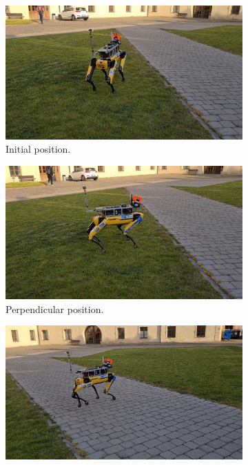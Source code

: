             \begin{figure}[ht]
                \centering
                \begin{subfigure}{0.49\textwidth}
                    \includegraphics[width=\textwidth]{images/init1.jpg}
                    \caption{Initial position.}
                    \label{fig:init1}
                \end{subfigure}
                \begin{subfigure}{0.49\textwidth}
                    \includegraphics[width=\textwidth]{images/perpendicular.jpg}
                    \caption{Perpendicular position.}
                    \label{fig:perpendicular}
                \end{subfigure}
                \begin{subfigure}{0.49\textwidth}
                    \includegraphics[width=\textwidth]{images/during1.jpg}

\end{subfigure}
\end{figure}
